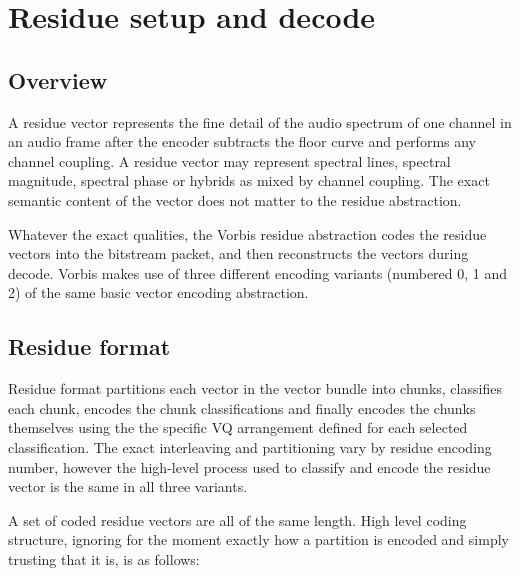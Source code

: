 \section{Residue setup and decode} \label{vorbis:spec:residue}

\subsection{Overview}

A residue vector represents the fine detail of the audio spectrum of
one channel in an audio frame after the encoder subtracts the floor
curve and performs any channel coupling.  A residue vector may
represent spectral lines, spectral magnitude, spectral phase or
hybrids as mixed by channel coupling.  The exact semantic content of
the vector does not matter to the residue abstraction.

Whatever the exact qualities, the Vorbis residue abstraction codes the
residue vectors into the bitstream packet, and then reconstructs the
vectors during decode.  Vorbis makes use of three different encoding
variants (numbered 0, 1 and 2) of the same basic vector encoding
abstraction.



\subsection{Residue format}

Residue format partitions each vector in the vector bundle into chunks,
classifies each chunk, encodes the chunk classifications and finally
encodes the chunks themselves using the the specific VQ arrangement
defined for each selected classification.
The exact interleaving and partitioning vary by residue encoding number,
however the high-level process used to classify and encode the residue
vector is the same in all three variants.

A set of coded residue vectors are all of the same length.  High level
coding structure, ignoring for the moment exactly how a partition is
encoded and simply trusting that it is, is as follows:

